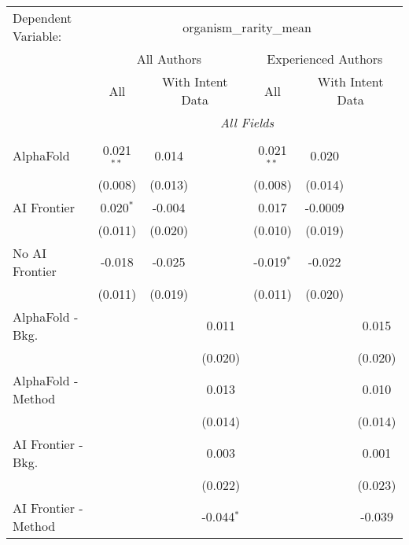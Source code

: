 \begingroup
\centering
\begin{tabular}{lcccccc}
   \tabularnewline \midrule \midrule
   Dependent Variable: & \multicolumn{6}{c}{organism\_rarity\_mean}\\
 & \multicolumn{3}{c}{All Authors} & \multicolumn{3}{c}{Experienced Authors} \\
\cmidrule(lr){2-4} \cmidrule(lr){5-7}
 & \multicolumn{1}{c}{All} & \multicolumn{2}{c}{With Intent Data} & \multicolumn{1}{c}{All} & \multicolumn{2}{c}{With Intent Data} \\
\cmidrule(lr){2-2} \cmidrule(lr){3-4} \cmidrule(lr){5-5} \cmidrule(lr){6-7}
 & \multicolumn{6}{c}{\textit{All Fields}} \\ \\
   AlphaFold               & 0.021$^{**}$ & 0.014   &              & 0.021$^{**}$ & 0.020   &   \\   
                           & (0.008)      & (0.013) &              & (0.008)      & (0.014) &   \\   
   AI Frontier             & 0.020$^{*}$  & -0.004  &              & 0.017        & -0.0009 &   \\   
                           & (0.011)      & (0.020) &              & (0.010)      & (0.019) &   \\   
   No AI Frontier          & -0.018       & -0.025  &              & -0.019$^{*}$ & -0.022  &   \\   
                           & (0.011)      & (0.019) &              & (0.011)      & (0.020) &   \\   
   AlphaFold - Bkg.        &              &         & 0.011        &              &         & 0.015\\   
                           &              &         & (0.020)      &              &         & (0.020)\\   
   AlphaFold - Method      &              &         & 0.013        &              &         & 0.010\\   
                           &              &         & (0.014)      &              &         & (0.014)\\   
   AI Frontier - Bkg.      &              &         & 0.003        &              &         & 0.001\\   
                           &              &         & (0.022)      &              &         & (0.023)\\   
   AI Frontier - Method    &              &         & -0.044$^{*}$ &              &         & -0.039\\   

\end{tabular}
